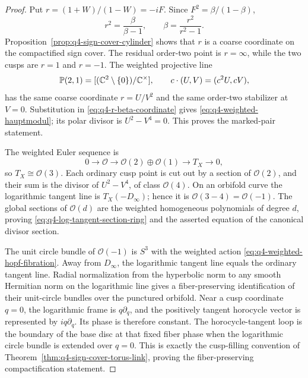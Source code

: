 \begin{proof}
Put
\(
 r=(1+W)/(1-W)=-iF
\).
Since $F^2=\beta/(1-\beta)$,
\begin{equation}
 r^2=\frac{\beta}{\beta-1},
 \qquad
 \beta=\frac{r^2}{r^2-1}.
 \label{eq:q4-r-beta-coordinate}
\end{equation}
Proposition~\ref{prop:q4-sign-cover-cylinder} shows that $r$ is a coarse
coordinate on the compactified sign cover.  The residual order-two point is
$r=\infty$, while the two cusps are $r=1$ and $r=-1$.  The weighted projective
line
\begin{equation}
 \mathbb P(2,1)
 =[(\mathbb{C}^2\setminus\{0\})/\mathbb{C}^\times],
 \qquad
 c\cdot(U,V)=(c^2U,cV),
 \label{eq:weighted-projective-line-definition}
\end{equation}
has the same coarse coordinate $r=U/V^2$ and the same order-two stabilizer at
$V=0$.  Substitution in \eqref{eq:q4-r-beta-coordinate} gives
\eqref{eq:q4-weighted-hauptmodul}; its polar divisor is
$U^2-V^4=0$.  This proves the marked-pair statement.

The weighted Euler sequence is
\begin{equation}
 0\longrightarrow\mathcal O
 \longrightarrow\mathcal O(2)\oplus\mathcal O(1)
 \longrightarrow T_X\longrightarrow0,
 \label{eq:q4-weighted-euler-sequence}
\end{equation}
so $T_X\cong\mathcal O(3)$.  Each ordinary cusp point is cut out by a section
of $\mathcal O(2)$, and their sum is the divisor of $U^2-V^4$, of class
$\mathcal O(4)$.  On an orbifold curve the logarithmic tangent line is
$T_X(-D_\infty)$; hence it is $\mathcal O(3-4)=\mathcal O(-1)$.  The global
sections of $\mathcal O(d)$ are the weighted homogeneous polynomials of degree
$d$, proving \eqref{eq:q4-log-tangent-section-ring} and the asserted equation
of the canonical divisor section.

The unit circle bundle of $\mathcal O(-1)$ is $S^3$ with the weighted action
\eqref{eq:q4-weighted-hopf-fibration}.  Away from $D_\infty$, the logarithmic
tangent line equals the ordinary tangent line.  Radial normalization from the
hyperbolic norm to any smooth Hermitian norm on the logarithmic line gives a
fiber-preserving identification of their unit-circle bundles over the punctured
orbifold.  Near a cusp coordinate $q=0$, the logarithmic frame is
$q\partial_q$, and the positively tangent horocycle vector is represented by
$i q\partial_q$.  Its phase is therefore constant.  The horocycle-tangent loop
is the boundary of the base disc at that fixed fiber phase when the logarithmic
circle bundle is extended over $q=0$.  This is exactly the cusp-filling convention of
Theorem~\ref{thm:q4-sign-cover-torus-link}, proving the fiber-preserving
compactification statement.


\end{proof}
